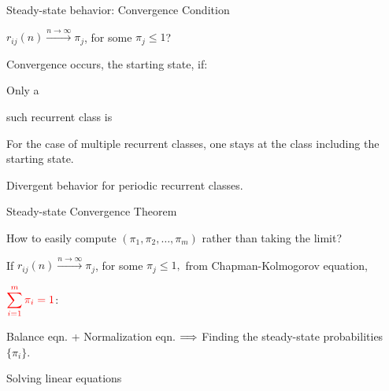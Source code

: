 \begin{frame}{Steady-state behavior: Convergence Condition}

{
\plitemsep 0.1in

\bci
\item $r_{ij}(n) \xrightarrow{n \rightarrow \infty} \pi_j$, for some $\pi_j \le 1$?

\item Convergence occurs,  the starting state, if:
\bce[\bf C1.]
\item<2-> Only a 
\item<4-> such recurrent class is 
\ece

\item<3->[\small\bf C1.] {\small For the case of multiple recurrent classes, one stays at the class including the starting state.} 

\item<5->[\small \bf C2.] {\small Divergent behavior for periodic recurrent classes. }

\eci

}
{
\vspace{-0.4cm}
\centering
{}

}

\end{frame}


\begin{frame}{Steady-state Convergence Theorem}

   How to easily compute $(\pi_1, \pi_2, \ldots, \pi_m)$
  rather than taking the limit?
  
\plitemsep 0.1in
\bci
\item<2-> If $r_{ij}(n) \xrightarrow{n \rightarrow \infty} \pi_j$, for
  some $\pi_j \le 1,$ from Chapman-Kolmogorov equation, 

\item<5-> $
\displaystyle {\color{red} \sum_{i=1}^m \pi_i = 1}
$: 

\item<6-> Balance eqn. + Normalization eqn. $\Longrightarrow$  Finding the steady-state probabilities $\{\pi_i \}.$
  \bci
  \item Solving linear equations
    \eci
  
\eci


\end{frame}


